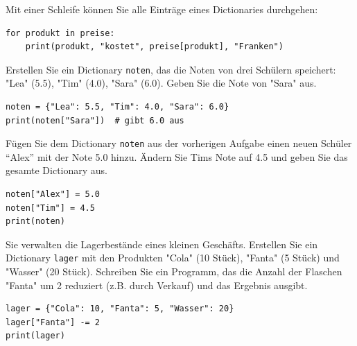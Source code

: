 \begin{myexample}
Mit einer Schleife können Sie alle Einträge eines Dictionaries durchgehen:
\begin{lstlisting}
for produkt in preise:
    print(produkt, "kostet", preise[produkt], "Franken")
\end{lstlisting}
\end{myexample}

\begin{myexercise}
    Erstellen Sie ein Dictionary \lstinline|noten|, das die Noten von drei Schülern speichert: "Lea" (5.5), "Tim" (4.0), "Sara" (6.0). Geben Sie die Note von "Sara" aus.

    \begin{myanswer}
        \begin{lstlisting}
noten = {"Lea": 5.5, "Tim": 4.0, "Sara": 6.0}
print(noten["Sara"])  # gibt 6.0 aus
\end{lstlisting}
    \end{myanswer}
\end{myexercise}

\begin{myexercise}
    Fügen Sie dem Dictionary \lstinline|noten| aus der vorherigen Aufgabe einen neuen Schüler \enquote{Alex} mit der Note 5.0 hinzu. Ändern Sie Tims Note auf 4.5 und geben Sie das gesamte Dictionary aus.

    \begin{myanswer}
        \begin{lstlisting}
noten["Alex"] = 5.0
noten["Tim"] = 4.5
print(noten)
\end{lstlisting}
    \end{myanswer}
\end{myexercise}

\begin{myexercise}
    Sie verwalten die Lagerbestände eines kleinen Geschäfts. Erstellen Sie ein Dictionary \lstinline|lager| mit den Produkten "Cola" (10 Stück), "Fanta" (5 Stück) und "Wasser" (20 Stück). Schreiben Sie ein Programm, das die Anzahl der Flaschen "Fanta" um 2 reduziert (z.B. durch Verkauf) und das Ergebnis ausgibt.

    \begin{myanswer}
        \begin{lstlisting}
lager = {"Cola": 10, "Fanta": 5, "Wasser": 20}
lager["Fanta"] -= 2
print(lager)
\end{lstlisting}
    \end{myanswer}
\end{myexercise}

